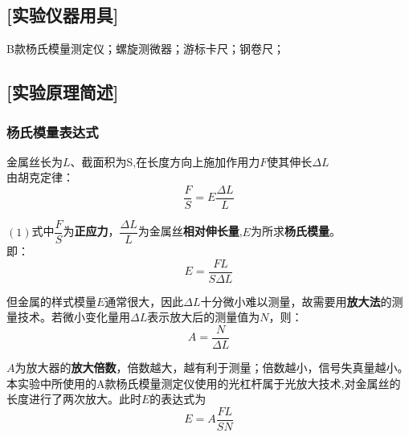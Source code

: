 \documentclass[UTF8]{article} %
\begin{document}
	\subsection*{[实验仪器用具]}
	\par B款杨氏模量测定仪；螺旋测微器；游标卡尺；钢卷尺；
	\subsection*{[实验原理简述]}
	\subsubsection*{杨氏模量表达式}
	\par 金属丝长为$L$、截面积为S,在长度方向上施加作用力$F$使其伸长$\Delta L$\\
	 由胡克定律：
	 \begin{equation}
	 	\frac{F}{S}=E\frac{\Delta L}{L}
	 \end{equation}
	
	\par $(1)$式中$\dfrac{F}{S}$为\textbf{正应力}，$\dfrac{\Delta L}{L}$为金属丝\textbf{相对伸长量},$E$为所求\textbf{杨氏模量}。\\
	即：
	\begin{equation*}
	E=\frac{FL}{S\Delta L}
	\end{equation*}
	\par 但金属的样式模量$E$通常很大，因此$\Delta L$十分微小难以测量，故需要用\textbf{放大法}的测量技术。若微小变化量用$\Delta L$表示放大后的测量值为$N$，则：
	\begin{equation*}
		A=\frac{N}{\Delta L}
	\end{equation*}
	\par $A$为放大器的\textbf{放大倍数}，倍数越大，越有利于测量；倍数越小，信号失真量越小。本实验中所使用的A款杨氏模量测定仪使用的光杠杆属于光放大技术,对金属丝的长度进行了两次放大。此时$E$的表达式为
	\begin{equation}
		E=A\frac{FL}{SN}
	\end{equation}
	\clearpage
	
	
\end{document}
